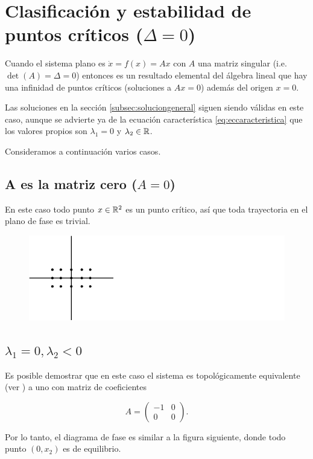 \section{Clasificación y estabilidad de puntos críticos ($\Delta = 0$)}

Cuando el sistema plano es $\dot{x} = f(x) = Ax$ con $A$ una matriz singular (i.e. $\det(A) = \Delta = 0$) entonces es un resultado elemental del álgebra lineal que hay una infinidad de puntos críticos (soluciones a $Ax = 0$) además del origen $x = 0$.

Las soluciones en la sección \ref{subsec:soluciongeneral} siguen siendo válidas en este caso, aunque se advierte ya de la ecuación característica \ref{eq:eccaracteristica} que los valores propios son $\lambda_1 = 0$ y $\lambda_2 \in {\ensuremath{\mathbb{R}}}$.

Consideramos a continuación varios casos.

\subsection{A es la matriz cero ($A = 0$)}
En este caso todo punto $x \in {\ensuremath{\mathbb{R}}}^2$ es un punto crítico, así que toda trayectoria en el plano de fase es trivial.

\begin{figure}[!ht] \centering
    \includegraphics[scale=1.0]{figures/amatriz0.pdf}  
\end{figure}


\subsection{$\lambda_1 = 0, \lambda_2 < 0$}
Es posible demostrar que en este caso el sistema es topológicamente equivalente (ver \cite[p.~239]{dynandbif}) a uno con matriz de coeficientes

$$ A = \left( \begin{array}{ll} -1 & 0 \\ 0 & 0 \end{array} \right).$$

Por lo tanto, el diagrama de fase es similar a la figura siguiente, donde todo punto $(0,x_2)$ es de equilibrio.


